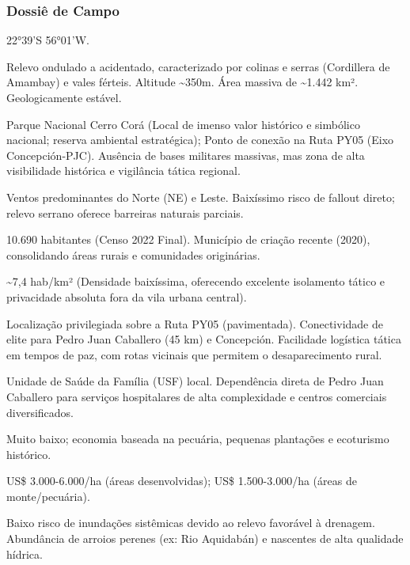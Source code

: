 \subsubsection{Dossiê de Campo}
\begin{description}[style=nextline,leftmargin=0.5cm,font=\bfseries]
\item[Coordenadas]  22°39'S 56°01'W.
\item[Topografia]  Relevo ondulado a acidentado, caracterizado por colinas e serras (Cordillera de Amambay) e vales férteis. Altitude \textasciitilde 350m. Área massiva de \textasciitilde 1.442 km². Geologicamente estável.
\item[Alvos Estratégicos]  Parque Nacional Cerro Corá (Local de imenso valor histórico e simbólico nacional; reserva ambiental estratégica); Ponto de conexão na Ruta PY05 (Eixo Concepción-PJC). Ausência de bases militares massivas, mas zona de alta visibilidade histórica e vigilância tática regional.
\item[Fallout]  Ventos predominantes do Norte (NE) e Leste. Baixíssimo risco de fallout direto; relevo serrano oferece barreiras naturais parciais.
\item[População]  10.690 habitantes (Censo 2022 Final). Município de criação recente (2020), consolidando áreas rurais e comunidades originárias.
\item[Densidade]  \textasciitilde 7,4 hab/\allowbreak km² (Densidade baixíssima, oferecendo excelente isolamento tático e privacidade absoluta fora da vila urbana central).
\item[Vias de Acesso]  Localização privilegiada sobre a Ruta PY05 (pavimentada). Conectividade de elite para Pedro Juan Caballero (45 km) e Concepción. Facilidade logística tática em tempos de paz, com rotas vicinais que permitem o desaparecimento rural.
\item[Serviços]  Unidade de Saúde da Família (USF) local. Dependência direta de Pedro Juan Caballero para serviços hospitalares de alta complexidade e centros comerciais diversificados.
\item[Custo de Vida]  Muito baixo; economia baseada na pecuária, pequenas plantações e ecoturismo histórico.
\item[Preço da Terra]  US\$ 3.000-6.000/\allowbreak ha (áreas desenvolvidas); US\$ 1.500-3.000/\allowbreak ha (áreas de monte/\allowbreak pecuária).
\item[Hidrologia]  Baixo risco de inundações sistêmicas devido ao relevo favorável à drenagem. Abundância de arroios perenes (ex: Rio Aquidabán) e nascentes de alta qualidade hídrica.

\end{description}
